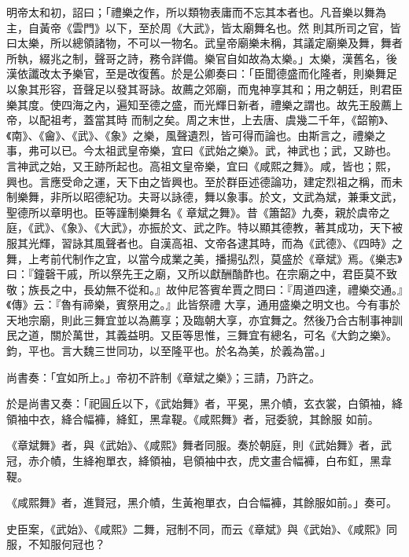 \begin{pinyinscope}
 明帝太和初，詔曰；「禮樂之作，所以類物表庸而不忘其本者也。凡音樂以舞為主，自黃帝《雲門》以下，至於周《大武》，皆太廟舞名也。然
 則其所司之官，皆曰太樂，所以總領諸物，不可以一物名。武皇帝廟樂未稱，其議定廟樂及舞，舞者所執，綴兆之制，聲哥之詩，務令詳備。樂官自如故為太樂。」太樂，漢舊名，後漢依讖改太予樂官，至是改復舊。於是公卿奏曰：「臣聞德盛而化隆者，則樂舞足以象其形容，音聲足以發其哥詠。故薦之郊廟，而鬼神享其和；用之朝廷，則君臣樂其度。使四海之內，遍知至德之盛，而光輝日新者，禮樂之謂也。故先王殷薦上帝，以配祖考，蓋當其時
 而制之矣。周之末世，上去唐、虞幾二千年，《韶箾》、《南》、《龠》、《武》、《象》之樂，風聲遺烈，皆可得而論也。由斯言之，禮樂之事，弗可以已。今太祖武皇帝樂，宜曰《武始之樂》。武，神武也；武，又跡也。言神武之始，又王跡所起也。高祖文皇帝樂，宜曰《咸熙之舞》。咸，皆也；熙，興也。言應受命之運，天下由之皆興也。至於群臣述德論功，建定烈祖之稱，而未制樂舞，非所以昭德紀功。夫哥以詠德，舞以象事。於文，文武為斌，兼秉文武，聖德所以章明也。臣等謹制樂舞名《
 章斌之舞》。昔《簫韶》九奏，親於虞帝之庭，《武》、《象》、《大武》，亦振於文、武之阼。特以顯其德教，著其成功，天下被服其光輝，習詠其風聲者也。自漢高祖、文帝各逮其時，而為《武德》、《四時》之舞，上考前代制作之宜，以當今成業之美，播揚弘烈，莫盛於《章斌》焉。《樂志》曰：『鐘磬干戚，所以祭先王之廟，又所以獻酬酳酢也。在宗廟之中，君臣莫不致敬；族長之中，長幼無不從和。』故仲尼答賓牟賈之問曰：『周道四達，禮樂交通。』《傳》云：『魯有禘樂，賓祭用之。』此皆祭禮
 大享，通用盛樂之明文也。今有事於天地宗廟，則此三舞宜並以為薦享；及臨朝大享，亦宜舞之。然後乃合古制事神訓民之道，關於萬世，其義益明。又臣等思惟，三舞宜有總名，可名《大鈞之樂》。鈞，平也。言大魏三世同功，以至隆平也。於名為美，於義為當。」



 尚書奏：「宜如所上。」帝初不許制《章斌之樂》；三請，乃許之。



 於是尚書又奏：「祀圓丘以下，《武始舞》者，平冕，黑介幘，玄衣裳，白領袖，絳領袖中衣，絳合幅褲，絳釭，黑韋鞮。《咸熙舞》者，冠委貌，其餘服
 如前。



 《章斌舞》者，與《武始》、《咸熙》舞者同服。奏於朝庭，則《武始舞》者，武冠，赤介幘，生絳袍單衣，絳領袖，皂領袖中衣，虎文畫合幅褲，白布釭，黑韋鞮。



 《咸熙舞》者，進賢冠，黑介幘，生黃袍單衣，白合幅褲，其餘服如前。」奏可。



 史臣案，《武始》、《咸熙》二舞，冠制不同，而云《章斌》與《武始》、《咸熙》同服，不知服何冠也？




\end{pinyinscope}
